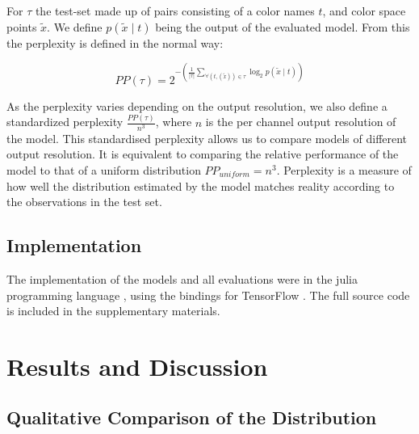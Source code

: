 \documentclass[11pt,letterpaper]{article}
\newcommand{\parencite}{\cite}
\begin{document}
For $\tau$ the test-set made up of pairs consisting of a color names $t$, and color space points $\tilde{x}$.
We define $p(\tilde{x}\mid t)$ being the output of the evaluated model.
From this the perplexity is defined in the normal way:

\[
 PP(\tau) = 2^{-\left(
 	\displaystyle\frac{1}{|\tau|} 
 	\displaystyle\sum_{
	 		\forall(t,(\tilde{x})) \in \tau}
 	 \log_2 p(\tilde{x}\mid t)\right)}
\]

As the perplexity varies depending on the output resolution,
we also define a standardized perplexity $\frac{PP(\tau)}{n^3}$, where $n$ is the per channel output resolution of the model.
This standardised perplexity allows us to compare models of different output resolution.
It is equivalent to comparing the relative performance of the model to that of a uniform distribution $PP_{uniform}=n^3$.
Perplexity is a measure of how well the distribution estimated by the model matches reality according to the observations in the test set.


\subsection{Implementation}
The implementation of the models and all evaluations were in the julia programming language \parencite{Julia},
using the bindings for TensorFlow \parencite{tensorflow2015-whitepaper}.
The full source code is included in the supplementary materials.

\section{Results and Discussion}\label{sec:results-and-discussion}

\subsection{Qualitative Comparison of the Distribution}\label{resultsdistributions}

\newcommand{\multimodalfig}[2]{
	\begin{figure}
		\texttt{[image: multimodal/empiri256\#1]}
		
		\vspace{3mm}
		
		\texttt{[image: multimodal/gru256\#1]}	
		\caption{\label{fig#1} Distribution estimate for \mbox{``#2''}}
	\end{figure}
}
\end{document}
